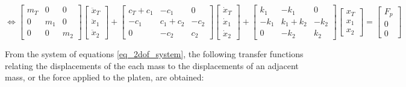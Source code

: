 \documentclass[10pt]{extarticle}
\begin{document}
\vspace{5mm}

\begin{equation*}
\Longleftrightarrow
\begin{bmatrix}
    m_T & 0 & 0 \\
    0 & m_1 & 0 \\
    0 & 0 & m_2
\end{bmatrix}
\begin{bmatrix}
    \ddot{x}_T \\ \ddot{x}_1 \\ \ddot{x}_2
\end{bmatrix}
+
\begin{bmatrix}
    c_T + c_1 & -c_1 & 0 \\
    -c_1 & c_1 + c_2 & -c_2 \\
    0 & -c_2 & c_2
\end{bmatrix}
\begin{bmatrix}
    \dot{x}_T \\ \dot{x}_1 \\ \dot{x}_2
\end{bmatrix}
+
\begin{bmatrix}
    k_1 & -k_1 & 0 \\
    -k_1 & k_1 + k_2 & -k_2 \\
    0 & -k_2 & k_2
\end{bmatrix}
\begin{bmatrix}
    x_T \\ x_1 \\ x_2
\end{bmatrix}
=
\begin{bmatrix}
    F_p \\ 0 \\ 0
\end{bmatrix}
\end{equation*}

    
\vspace{5mm}
From the system of equations \ref{eq_2dof_system}, the following transfer functions relating the displacements of the each mass to the displacements of an adjacent mass, or the force applied to the platen, are obtained:
\end{document}
